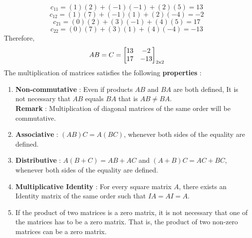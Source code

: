 \documentclass[12pt, letterpaper]{article}
\begin{document}
$$c_{11} = (1)(2) + (-1)(-1) + (2)(5) = 13$$
$$c_{12} = (1)(7) + (-1)(1) + (2)(-4) = -2$$
$$c_{21} = (0)(2) + (3)(-1) + (4)(5) = 17$$ 
$$c_{22} = (0)(7) + (3)(1) + (4)(-4) = -13$$
Therefore, 
\begin{displaymath}
AB = C = \begin{bmatrix}
13 & -2\\
17 & -13
\end{bmatrix}_{2 \textnormal{x} 2}
\end{displaymath}
The multiplication of matrices satisfies the following \textbf{properties} : 
\begin{enumerate}
    \item \textbf{Non-commutative} : Even if products $AB$ and $BA$ are both defined, It is not necessary that $AB$ equals $BA$ that is $AB \neq BA$.\\
    \textbf{Remark} : Multiplication of diagonal matrices of the same order will be commutative.
    \item \textbf{Associative} : $(AB)C = A(BC)$, whenever both sides of the equality are defined.
    \item \textbf{Distributive} : $A(B+C) = AB + AC$ and $(A+B)C = AC + BC$, whenever both sides of the equality are defined.
    \item \textbf{Multiplicative Identity} : For every square matrix $A$, there exists an Identity matrix of the same order such that $IA = AI = A$.
    \item If the product of two matrices is a zero matrix, it is not necessary that one of the matrices has to be a zero matrix. That is, the product of two non-zero matrices can be a zero matrix. 
\end{enumerate}
\end{document}
